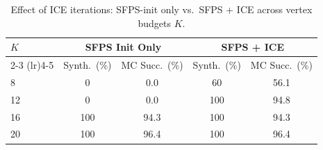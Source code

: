 \begin{table}[htbp]
\centering
\caption{Effect of ICE iterations: SFPS-init only vs.\ SFPS + ICE across vertex budgets $K$.}
\label{tab:vsel_ksweep}
\begin{tabular}{l c c c c}
\toprule
$K$ & \multicolumn{2}{c}{\textbf{SFPS Init Only}} & \multicolumn{2}{c}{\textbf{SFPS + ICE}} \\
\cmidrule(lr){2-3} \cmidrule(lr){4-5}
 & Synth.\ (\%) & MC Succ.\ (\%) & Synth.\ (\%) & MC Succ.\ (\%) \\
\midrule
8 & 0 & 0.0 & 60 & 56.1 \\
12 & 0 & 0.0 & 100 & 94.8 \\
16 & 100 & 94.3 & 100 & 94.3 \\
20 & 100 & 96.4 & 100 & 96.4 \\
\bottomrule
\end{tabular}
\end{table}
